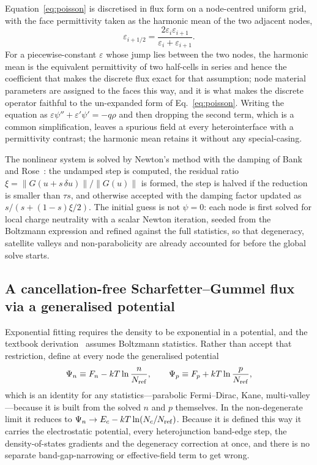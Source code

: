 \documentclass[preprint,12pt]{elsarticle}
\begin{document}
Equation~\eqref{eq:poisson} is discretised in flux form on a node-centred
uniform grid, with the face permittivity taken as the harmonic mean of the two
adjacent nodes,
\begin{equation}
  \varepsilon_{i+1/2} = \frac{2\varepsilon_i\varepsilon_{i+1}}
  {\varepsilon_i+\varepsilon_{i+1}} .
  \label{eq:harmonic}
\end{equation}
For a piecewise-constant $\varepsilon$ whose jump lies between the two nodes,
the harmonic mean is the equivalent permittivity of two half-cells in series
and hence the coefficient that makes the discrete flux exact for that
assumption; node material parameters are assigned to the faces this way, and
it is what makes the discrete operator faithful to the un-expanded form of
Eq.~\eqref{eq:poisson}. Writing the
equation as $\varepsilon\psi''+\varepsilon'\psi'=-q\rho$ and then dropping the
second term, which is a common simplification, leaves a spurious field at every
heterointerface with a permittivity contrast; the harmonic mean retains it
without any special-casing.

The nonlinear system is solved by Newton's method with the damping of Bank and
Rose~\cite{BankRose1981}: the undamped step is computed, the residual ratio
$\xi=\|G(u+s\,\delta u)\|/\|G(u)\|$ is formed, the step is halved if the
reduction is smaller than $\tau s$, and otherwise accepted with the damping
factor updated as $s/(s+(1-s)\xi/2)$. The initial guess is not $\psi=0$: each
node is first solved for local charge neutrality with a scalar Newton
iteration, seeded from the Boltzmann expression and refined against the full
statistics, so that degeneracy, satellite valleys and non-parabolicity are
already accounted for before the global solve starts.

\subsection{A cancellation-free Scharfetter--Gummel flux via a generalised potential}
\label{sec:sg}

Exponential fitting requires the density to be exponential in a potential, and
the textbook derivation~\cite{Scharfetter1969} assumes Boltzmann statistics. Rather than accept that
restriction, define at every node the generalised potential
\begin{equation}
  \Psi_n \equiv F_n - kT\ln\frac{n}{N_{\rm ref}},
  \qquad
  \Psi_p \equiv F_p + kT\ln\frac{p}{N_{\rm ref}},
  \label{eq:psi}
\end{equation}
which is an identity for any statistics---parabolic Fermi--Dirac, Kane,
multi-valley---because it is built from the solved $n$ and $p$ themselves. In
the non-degenerate limit it reduces to $\Psi_n\to E_c-kT\ln(N_c/N_{\rm ref})$.
Because it is defined this way it carries the electrostatic potential, every
heterojunction band-edge step, the density-of-states gradients and the
degeneracy correction at once, and there is no separate band-gap-narrowing or
effective-field term to get wrong.
\end{document}
